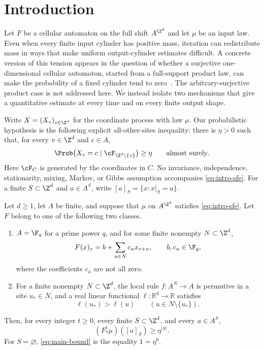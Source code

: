 \section{Introduction}\label{sec:introduction}

Let $F$ be a cellular automaton on the full shift $A^{\Z^d}$ and let $\mu$ be
an input law.  Even when every finite input cylinder has positive mass,
iteration can redistribute mass in ways that make uniform output-cylinder
estimates difficult.  A concrete version of this tension appears in the
question of whether a surjective one-dimensional cellular automaton, started
from a full-support product law, can make the probability of a fixed cylinder
tend to zero~\cite[Question~1]{hellouinSaloTorma2026frequencies}.  The
arbitrary-surjective product case is not addressed here.  We instead isolate
two mechanisms that give a quantitative estimate at every time and on every
finite output shape.

Write $X=(X_v)_{v\in\Z^d}$ for the coordinate process with law $\mu$.  Our
probabilistic hypothesis is the following explicit all-other-sites
inequality: there is $\eta>0$ such that, for every $v\in\Z^d$ and $c\in A$,
\begin{equation}\label{eq:intro-sfe}
  \Prob\bigl(X_v=c\mid\cF_{\Z^d\setminus\{v\}}\bigr)\geq\eta
  \qquad\text{almost surely}.
\end{equation}
Here $\cF_C$ is generated by the coordinates in $C$.  No invariance,
independence, stationarity, mixing, Markov, or Gibbs assumption accompanies
\eqref{eq:intro-sfe}.  For a finite $S\subset\Z^d$ and $a\in A^S$, write
$[a]_S=\{x:x|_S=a\}$.

\begin{theorem}\label{thm:main}
Let $d\geq1$, let $A$ be finite, and suppose that $\mu$ on $A^{\Z^d}$
satisfies \eqref{eq:intro-sfe}.  Let $F$ belong to one of the following two
classes.
\begin{enumerate}[label=\textup{(\roman*)}]
  \item $A=\F_q$ for a prime power $q$, and for some finite nonempty
  $N\subset\Z^d$,
  \[
      F(x)_v=b+\sum_{u\in N}c_u x_{v+u},
      \qquad b,c_u\in\F_q,
  \]
  where the coefficients $c_u$ are not all zero.
  \item For a finite nonempty $N\subset\Z^d$, the local rule
  $f\colon A^N\to A$ is permutive in a site $u_*\in N$, and a real linear
  functional $\ell\colon\mathbb R^d\to\mathbb R$ satisfies
  \[
      \ell(u_*)>\ell(u)\qquad(u\in N\setminus\{u_*\}).
  \]
\end{enumerate}
Then, for every integer $t\geq0$, every finite $S\subset\Z^d$, and every
$a\in A^S$,
\begin{equation}\label{eq:main-bound}
    (F^t_*\mu)([a]_S)\geq\eta^{|S|}.
\end{equation}
For $S=\varnothing$, \eqref{eq:main-bound} is the equality $1=\eta^0$.
\end{theorem}

